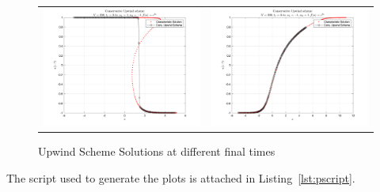 \documentclass[11pt]{article}
\begin{document}
\begin{enumerate}
\begin{enumerate}
\begin{figure}[htp]
\begin{tabular}{cc}
	\includegraphics[width=3.4in]{Q2_5.png} & \includegraphics[width=3.4in]{Q2_6.png}
	\end{tabular}
	\caption{Upwind Scheme Solutions at different final times}
	\label{fig:nsolution}
      \end{figure}
      
    \end{enumerate}

\end{enumerate}

The script used to generate the plots is attached in Listing~\ref{lst:pscript}.

\end{document}
